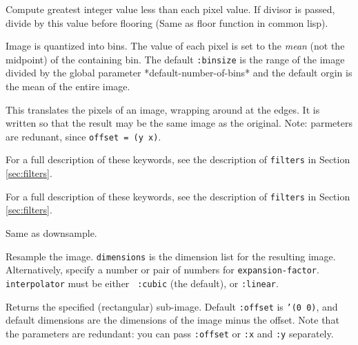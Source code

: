 \begin{description}
\item{}
Compute greatest integer value less than each pixel value.  If divisor
is passed, divide by this value before flooring (Same as floor
function in common lisp).

\item{}
Image is quantized into bins.  The value of each pixel is set to the
{\em mean} (not the midpoint) of the containing bin.
The default {\tt :binsize} is the range of the image divided by the global
parameter *default-number-of-bins* and the default orgin is the mean
of the entire image.
\end{description}



\begin{description}
\item{}
This translates the pixels of an image, wrapping around at the edges.
It is written so that the result may be the same image as the
original.  Note: parmeters are redunant, since {\tt offset = (y x)}.

\item{}
For a full description of these keywords, see the description of
{\tt filters} in Section \ref{sec:filters}.

\item{}
For a full description of these keywords, see the description of
{\tt filters} in Section \ref{sec:filters}.

\item{}
Same as downsample.

\item{}
Resample the image.  {\tt dimensions} is the dimension list for the
resulting image.  Alternatively, specify a number or pair of numbers
for {\tt expansion-factor}.  {\tt interpolator} must be either {\tt
:cubic} (the default), or {\tt :linear}.

\item{}
Returns the specified (rectangular) sub-image.  Default {\tt :offset}
is {\tt '(0 0)}, and default dimensions are the dimensions of the
image minus the offset. Note that the parameters are redundant: you
can pass {\tt :offset} or {\tt :x} and {\tt :y} separately.


\end{description}
